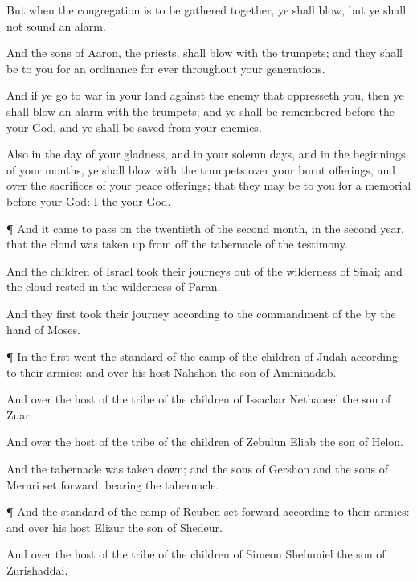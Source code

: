 {But when the
congregation is to be gathered
together, ye shall
blow, but ye shall not sound an
alarm.

And the
sons of
Aaron, the
priests, shall
blow with the
trumpets; and they shall be to you for an
ordinance for
ever throughout your
generations.

And if ye
go to
war in your
land
against the enemy that
oppresseth you, then ye shall blow an
alarm with the
trumpets; and ye shall be
remembered
before the
{} your
God, and ye shall be
saved from your
enemies.

Also in the
day of your
gladness, and in your solemn
days, and in the
beginnings of your
months, ye shall
blow with the
trumpets over your burnt
offerings, and over the
sacrifices of your peace
offerings; that they may be to you for a
memorial
before your
God: I
{} the
{} your
God.


\par }{\PP {}¶ And it came to pass on the
twentieth
{} of the
second
month, in the
second
year, that the
cloud was taken
up from off the
tabernacle of the
testimony.

And the
children of
Israel
took their
journeys out of the
wilderness of
Sinai; and the
cloud
rested in the
wilderness of
Paran.

And they
first took their
journey according to the
commandment of the
{} by the
hand of
Moses.


\par }{\PP {}¶ In the
first
{}
went the
standard of the
camp of the
children of
Judah according to their
armies: and over his host
{}
Nahshon the
son of
Amminadab.

And over the
host of the
tribe of the
children of
Issachar
{}
Nethaneel the
son of
Zuar.

And over the
host of the
tribe of the
children of
Zebulun
{}
Eliab the
son of
Helon.

And the
tabernacle was taken
down; and the
sons of
Gershon and the
sons of
Merari set
forward,
bearing the
tabernacle.


\par }{\PP {}¶ And the
standard of the
camp of
Reuben set
forward according to their
armies: and over his
host
{}
Elizur the
son of
Shedeur.

And over the
host of the
tribe of the
children of
Simeon
{}
Shelumiel the
son of
Zurishaddai.

}
